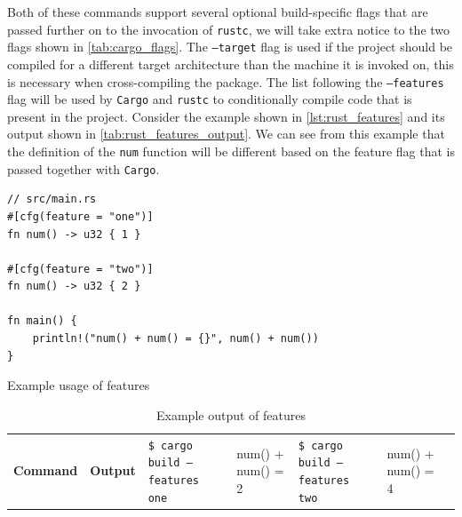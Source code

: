 Both of these commands support several optional build-specific flags that are passed further on to the invocation of \texttt{rustc}, we will take extra notice to the two flags shown in \autoref{tab:cargo_flags}.
The \texttt{--target} flag is used if the project should be compiled for a different target architecture than the machine it is invoked on, this is necessary when cross-compiling the package.
The list following the \texttt{--features} flag will be used by \texttt{Cargo} and \texttt{rustc} to conditionally compile code that is present in the project.
Consider the example shown in \autoref{lst:rust_features} and its output shown in \autoref{tab:rust_features_output}.
We can see from this example that the definition of the \texttt{num} function will be different based on the feature flag that is passed together with \texttt{Cargo}.

\begin{listing}[H]
\begin{verbatim}
// src/main.rs
#[cfg(feature = "one")]
fn num() -> u32 { 1 }

#[cfg(feature = "two")]
fn num() -> u32 { 2 }

fn main() {
    println!("num() + num() = {}", num() + num())
}
\end{verbatim}
\caption{Example usage of features}
\label{lst:rust_features}
\end{listing}

\begin{table}[ht]
\begin{center}
\begin{tabular}{r|l}
\textbf{Command} & \textbf{Output}                          &
\hline
\texttt{\$ cargo build --features one}  & num() + num() = 2 &
\texttt{\$ cargo build --features two}  & num() + num() = 4 &
\hline
\end{tabular}
\caption{Example output of features}
\label{tab:rust_features_output}
\end{center}
\end{table}
